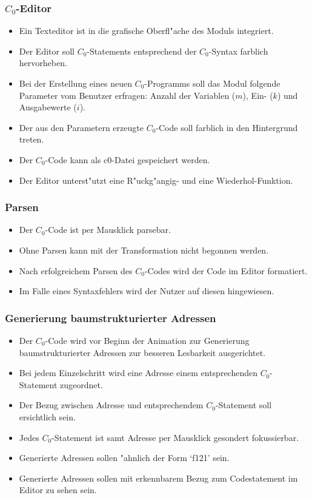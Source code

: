 \begin{itemize}
	\subsubsection{$C_0$-Editor}
	\begin{itemize}
    \item Ein Texteditor ist in die grafische Oberfl"ache des Moduls
    integriert.
    \item Der Editor soll $C_0$-Statements entsprechend der $C_0$-Syntax
    farblich hervorheben.
    \item Bei der Erstellung eines neuen $C_0$-Programms soll das Modul
    folgende Parameter vom Benutzer erfragen: Anzahl der Variablen ($m$), Ein- ($k$) und Ausgabewerte ($i$).
		\item Der aus den Parametern erzeugte $C_0$-Code soll farblich in den Hintergrund treten.
    \item Der $C_0$-Code kann als c0-Datei gespeichert werden.
	  \item Der Editor unterst"utzt eine R"uckg"angig- und eine Wiederhol-Funktion.
	\end{itemize}

	\subsubsection{Parsen}
  \begin{itemize}
    \item Der $C_0$-Code ist per Mausklick parsebar.
    \item Ohne Parsen kann mit der Transformation nicht begonnen werden.
		\item Nach erfolgreichem Parsen des $C_0$-Codes wird der Code im Editor formatiert.
    \item Im Falle eines Syntaxfehlers wird der Nutzer auf diesen hingewiesen.
  \end{itemize}
  
  \subsubsection{Generierung baumstrukturierter Adressen}
	\begin{itemize}
    \item Der $C_0$-Code wird vor Beginn der Animation zur Generierung
    baumstrukturierter Adressen zur besseren Lesbarkeit ausgerichtet.
    \item Bei jedem Einzelschritt wird eine Adresse einem entsprechenden
    $C_0$-Statement zugeordnet.
    \item Der Bezug zwischen Adresse und entsprechendem $C_0$-Statement soll
    ersichtlich sein.
    \item Jedes $C_0$-Statement ist samt Adresse per Mausklick gesondert
    fokussierbar.
    \item Generierte Adressen sollen "ahnlich der Form `f121' sein.
    \item Generierte Adressen sollen  mit erkennbarem Bezug zum Codestatement
    im Editor zu sehen sein.
	\end{itemize}


\end{itemize}
